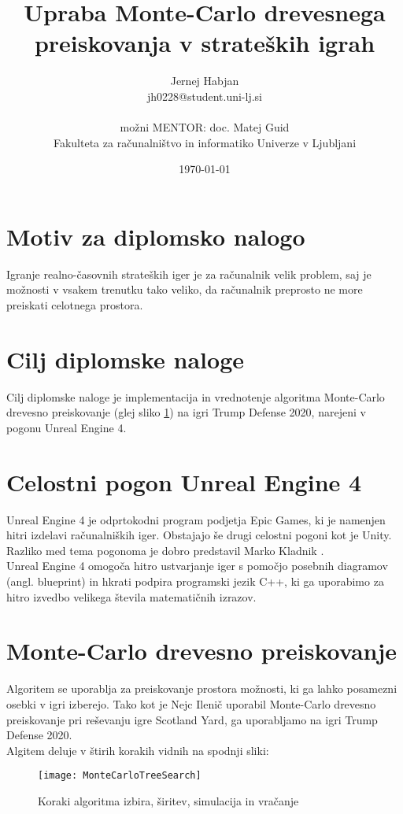 \documentclass[11pt,a4paper]{article}
\title{Upraba Monte-Carlo drevesnega preiskovanja v strateških igrah}
\author{Jernej Habjan\\
jh0228@student.uni-lj.si\\
\ \\
možni MENTOR: doc. Matej Guid \\
Fakulteta za računalništvo in informatiko Univerze v Ljubljani
\date{\today}         
}
\begin{document}
\maketitle

\section{Motiv za diplomsko nalogo}
Igranje realno-časovnih strateških iger je za računalnik velik problem, saj je možnosti v vsakem trenutku tako veliko, da računalnik preprosto ne more preiskati celotnega prostora.
\section{Cilj diplomske naloge}
Cilj diplomske naloge je implementacija in vrednotenje algoritma Monte-Carlo drevesno preiskovanje (glej sliko  \ref{fig:monteCarlo}) na igri Trump Defense 2020, narejeni v pogonu Unreal Engine 4.

\section{Celostni pogon Unreal Engine 4}
Unreal Engine 4 je odprtokodni program podjetja Epic Games, ki je namenjen hitri izdelavi računalniških iger. Obstajajo še drugi celostni pogoni kot je Unity.\\
Razliko med tema pogonoma je dobro predstavil Marko Kladnik \cite{diplomaUnityUnreal}.\\
Unreal Engine 4 omogoča hitro ustvarjanje iger s pomočjo posebnih diagramov (angl. blueprint) in hkrati podpira programski jezik C++, ki ga uporabimo za hitro izvedbo velikega števila matematičnih izrazov.

\section{Monte-Carlo drevesno preiskovanje}
Algoritem se uporablja za preiskovanje prostora možnosti, ki ga lahko posamezni osebki v igri izberejo.
Tako kot je Nejc Ilenič uporabil Monte-Carlo drevesno preiskovanje pri reševanju igre Scotland Yard\cite{diplomaMonteCarlo}, ga uporabljamo na igri Trump Defense 2020.\\
Algitem deluje v štirih korakih vidnih na spodnji sliki:
\begin{figure}[htb]
	\begin{center}
		\texttt{[image: MonteCarloTreeSearch]}
	\end{center}
	\caption{Koraki algoritma izbira, širitev, simulacija in vračanje}
	\label{fig:monteCarlo}
\end{figure}
\end{document}
